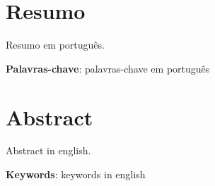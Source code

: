 \thispagestyle{empty}
\chapter*{Resumo}
  Resumo em português.

\textbf{Palavras-chave}: palavras-chave em português

\chapter*{Abstract}
  Abstract in english.

\textbf{Keywords}: keywords in english
\thispagestyle{empty}
